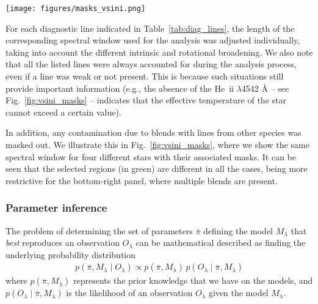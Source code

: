 \documentclass{aa}
\newcommand{\vsini}{\mbox{$v\sin i$}\xspace}
\newcommand{\Teff}{\mbox{$T_{\rm eff}$}\xspace}
\let\oldAA\AA
\renewcommand*{\AA}{\,\oldAA\xspace}
\newcommand{\kms}{\,\mbox{km\,s$^{-1}$}\xspace}
\newcommand{\num}[1]{\textcolor{red}{#1}}
\begin{document}
\begin{figure*}[t!]
\centering
\texttt{[image: figures/masks\_vsini.png]}
\caption{Examples of different masks used to select the diagnostic lines. Each of the four panels shows the same wavelength range including the He~{\sc ii} $\lambda$4542\,{\AA} line and the Si~{\sc iii} $\lambda\lambda$4553,4568,4575\,{\AA} triplet. The two panels on the left compare two stars of similar temperature but different \vsini: HD\,14\,302 with \vsini$\approx$\num{65}\kms (top-left), and HD\,197\,460 with \vsini$\approx$\num{200}\kms (bottom-left). 
The two panels on the right compare two stars of similar \vsini but very different \Teff: HD\,24\,432 with \Teff=\,15\,kK (top-right) and HD\,190\,991 with \Teff=\,32\,kK (bottom-right). The wavelength ranges selected for each analysis are shaded in green. The masked (not used) regions are shaded in red.}
\label{fig:vsini_masks}
\end{figure*}

For each diagnostic line indicated in Table~\ref{tab:diag_lines}, the length of the corresponding spectral window used for the analysis was adjusted individually, taking into account the different intrinsic and rotational broadening. We also note that all the listed lines were always accounted for during the analysis process, even if a line was weak or not present. This is because such situations still provide important information (e.g., the absence of the He~{\sc ii} $\lambda$4542\,{\AA} -- see Fig.~\ref{fig:vsini_masks} -- indicates that the effective temperature of the star cannot exceed a certain value).

In addition, any contamination due to blends with lines from other species was masked out. We illustrate this in Fig.~\ref{fig:vsini_masks}, where we show the same spectral window for four different stars with their associated masks. It can be seen that the selected regions (in green) are different in all the cases, being more restrictive for the bottom-right panel, where multiple blends are present.


\subsubsection{Parameter inference}
\label{subsubsection:324_tmp}

The problem of determining the set of parameters $\overline{\pi}$ defining the model $M_\lambda$ that {\it best} reproduces an observation $O_\lambda$ can be mathematical described as finding the underlying probability distribution
%
\begin{align*}
p\left(\overline{\pi}, M_\lambda \mid O_\lambda\right) \propto p\left(\overline{\pi}, M_\lambda\right)\,p\left(O_\lambda \mid  \overline{\pi}, M_\lambda \right)
\end{align*}
%
where $p\left(\overline{\pi}, M_\lambda\right)$ represents the prior knowledge that we have on the models, and $p\left(O_\lambda \mid \overline{\pi}, M_\lambda \right)$ is the likelihood of an observation $O_\lambda$ given the model $M_\lambda$.
\end{document}
